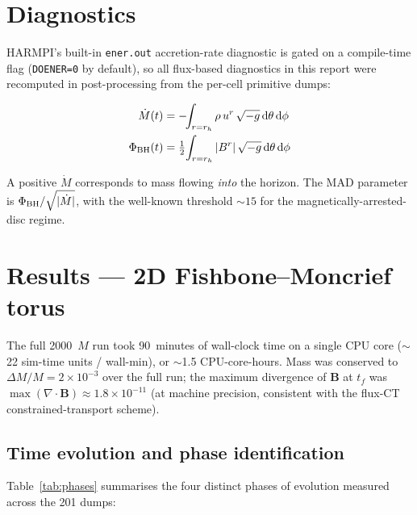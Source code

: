\documentclass[11pt]{article}
\begin{document}
\section{Diagnostics}

\textsc{HARMPI}'s built-in \texttt{ener.out} accretion-rate diagnostic is gated on a
compile-time flag (\texttt{DOENER=0} by default), so all flux-based diagnostics in this
report were recomputed in post-processing from the per-cell primitive dumps:

\begin{align}
\dot M(t)      &= -\!\!\int_{r=r_h} \rho\,u^r\,\sqrt{-g}\,\mathrm{d}\theta\,\mathrm{d}\phi \\
\Phi_{\rm BH}(t) &= \tfrac{1}{2}\!\int_{r=r_h} |B^r|\,\sqrt{-g}\,\mathrm{d}\theta\,\mathrm{d}\phi
\end{align}

A positive $\dot M$ corresponds to mass flowing \emph{into} the horizon. The MAD parameter
is $\Phi_{\rm BH}/\sqrt{|\dot M|}$, with the well-known threshold $\sim 15$
\citep[Tchekhovskoy et al. 2011]{tchekhovskoy11} for the magnetically-arrested-disc regime.

\section{Results --- 2D Fishbone--Moncrief torus}

The full 2000~$M$ run took 90~minutes of wall-clock time on a single CPU core
($\sim$22 sim-time units / wall-min), or $\sim$1.5 CPU-core-hours. Mass was conserved
to $\Delta M / M = 2 \times 10^{-3}$ over the full run; the maximum divergence of
$\mathbf{B}$ at $t_f$ was $\max(\nabla \cdot \mathbf{B}) \approx 1.8 \times 10^{-11}$
(at machine precision, consistent with the flux-CT constrained-transport scheme).

\subsection{Time evolution and phase identification}

Table~\ref{tab:phases} summarises the four distinct phases of evolution measured
across the 201 dumps:
\end{document}
